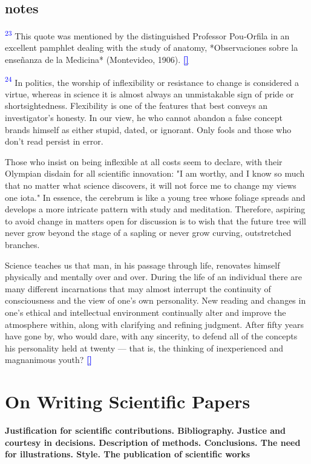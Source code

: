 \documentclass{article}
\newcommand{\boldline}[1]{%
 \vspace{\baselineskip}%
 \noindent\textbf{#1}\\[0.5\baselineskip]%
}
\newcommand{\notetext}[2]{
 \par\noindent
 \hypertarget{note:#1}{\textsuperscript{\textcolor{blue}{#1}}} #2
 \hyperlink{ref:#1}{\textcolor{blue}{\textbf{[\textuparrow]}}}
 \par\vspace{1em}
}
\begin{document}
\subsection*{notes}

\notetext{23}{ This quote was mentioned by the distinguished Professor Pou-Orfila in an excellent pamphlet dealing with the study of anatomy, *Observaciones sobre la enseñanza de la Medicina* (Montevideo, 1906). }

\notetext{24}{ In politics, the worship of inflexibility or resistance to change is considered a virtue, whereas in science it is almost always an unmistakable sign of pride or shortsightedness. Flexibility is one of the features that best conveys an investigator’s honesty. In our view, he who cannot abandon a false concept brands himself as either stupid, dated, or ignorant. Only fools and those who don’t read persist in error.

Those who insist on being inflexible at all costs seem to declare, with their Olympian disdain for all scientific innovation: "I am worthy, and I know so much that no matter what science discovers, it will not force me to change my views one iota." In essence, the cerebrum is like a young tree whose foliage spreads and develops a more intricate pattern with study and meditation. Therefore, aspiring to avoid change in matters open for discussion is to wish that the future tree will never grow beyond the stage of a sapling or never grow curving, outstretched branches.

Science teaches us that man, in his passage through life, renovates himself physically and mentally over and over. During the life of an individual there are many different incarnations that may almost interrupt the continuity of consciousness and the view of one’s own personality. New reading and changes in one’s ethical and intellectual environment continually alter and improve the atmosphere within, along with clarifying and refining judgment. After fifty years have gone by, who would dare, with any sincerity, to defend all of the concepts his personality held at twenty — that is, the thinking of inexperienced and magnanimous youth? }

\newpage \section{On Writing Scientific Papers}

\boldline{Justification for scientific contributions. Bibliography. Justice and courtesy in decisions. Description of methods. Conclusions. The need for illustrations. Style. The publication of scientific works}
\end{document}
